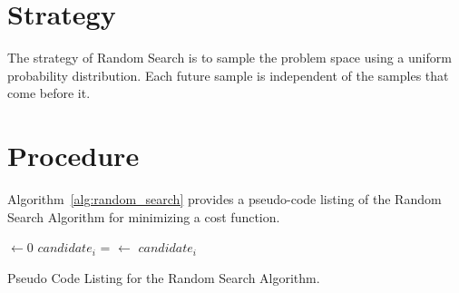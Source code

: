 \documentclass[a4paper, 11pt]{article}
\begin{document}
\section{Strategy}
\label{sec:strategy}
The strategy of Random Search is to sample the problem space using a uniform probability distribution. Each future sample is independent of the samples that come before it.

\section{Procedure}
\label{sec:procedure}
Algorithm~\ref{alg:random_search} provides a pseudo-code listing of the Random Search Algorithm for minimizing a cost function.

\begin{algorithm}[htp]
	\SetLine
	\KwIn{\NumIterations, \ProblemSize}
	\KwOut{\Best}
	\Best $\leftarrow 0$\;
	 {
		$candidate_i$ = \RandomSolution{\ProblemSize}\;
		 {
			\Best $\leftarrow$ $candidate_i$\;
		}
	}
	\Return{\Best}\;
	\caption{Pseudo Code Listing for the Random Search Algorithm.}
	\label{alg:random_search}
\end{algorithm}
\end{document}
